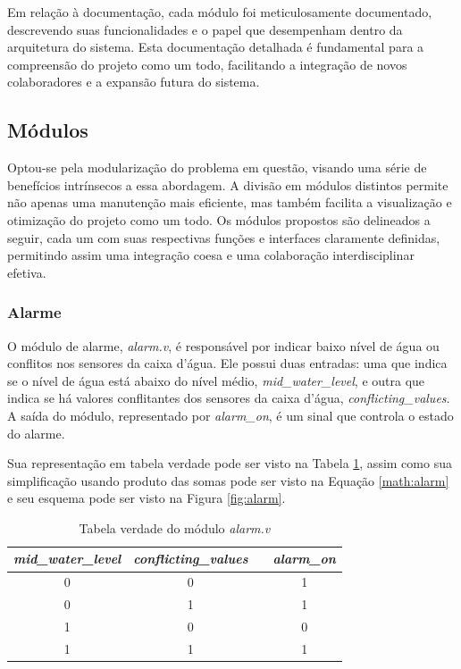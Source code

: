 \documentclass[
	article,			%
	11pt,				%
	oneside,			%
	a4paper,			%
	english,			%
	brazil,				%
	sumario=tradicional
	]{abntex2}
\begin{document}
Em relação à documentação, cada módulo foi meticulosamente documentado, descrevendo suas funcionalidades e o papel que desempenham dentro da arquitetura do sistema. Esta documentação detalhada é fundamental para a compreensão do projeto como um todo, facilitando a integração de novos colaboradores e a expansão futura do sistema.

\subsection{Módulos}

Optou-se pela modularização do problema em questão, visando uma série de benefícios intrínsecos a essa abordagem. A divisão em módulos distintos permite não apenas uma manutenção mais eficiente, mas também facilita a visualização e otimização do projeto como um todo. Os módulos propostos são delineados a seguir, cada um com suas respectivas funções e interfaces claramente definidas, permitindo assim uma integração coesa e uma colaboração interdisciplinar efetiva. 

\subsubsection{Alarme}

O módulo de alarme, \textit{alarm.v}, é responsável por indicar baixo nível de água ou conflitos nos sensores da caixa d’água. 
Ele possui duas entradas: uma que indica se o nível de água está abaixo do nível médio, \textit{mid\_water\_level}, e outra que indica se há valores conflitantes dos sensores da caixa d'água, \textit{conflicting\_values}. 
A saída do módulo, representado por \textit{alarm\_on}, é um sinal que controla o estado do alarme. 

Sua representação em tabela verdade pode ser visto na Tabela \ref{tab:alarm}, assim como sua simplificação usando produto das somas pode ser visto na Equação \eqref{math:alarm} e seu esquema pode ser visto na Figura \ref{fig:alarm}.

\begin{table}[h]
\centering
\begin{tabular}{|c|c|c|c|}
\hline
\textit{mid\_water\_level} & \textit{conflicting\_values} & \textit{} & \textit{alarm\_on} \\ \hline
0 & 0 &  & 1 \\ \hline
0 & 1 &  & 1 \\ \hline
1 & 0 &  & 0 \\ \hline
1 & 1 &  & 1 \\ \hline
\end{tabular}
\caption{Tabela verdade do módulo \textit{alarm.v}}
\label{tab:alarm}
\end{table}
\end{document}
